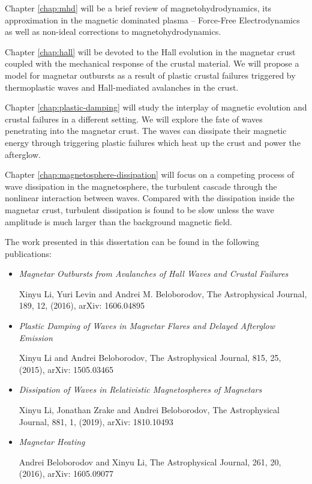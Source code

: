 Chapter \ref{chap:mhd} will be a brief review of magnetohydrodynamics, its approximation in the magnetic dominated plasma -- Force-Free Electrodynamics as well as non-ideal corrections to magnetohydrodynamics.

Chapter \ref{chap:hall} will be devoted to the Hall evolution in the magnetar crust coupled with the mechanical response of the crustal material. We will propose a model for magnetar outbursts as a result of plastic crustal failures triggered by thermoplastic waves and Hall-mediated avalanches in the crust.

Chapter \ref{chap:plastic-damping} will study the interplay of magnetic evolution and crustal failures in a different setting. We will explore the fate of \alfven waves penetrating into the magnetar crust. The \alfven waves can dissipate their magnetic energy through triggering plastic failures which heat up the crust and power the afterglow.

Chapter \ref{chap:magnetosphere-dissipation} will focus on a competing process of \alfven wave dissipation in the magnetosphere, the turbulent cascade through the nonlinear interaction between waves. Compared with the dissipation inside the magnetar crust, turbulent dissipation is found to be slow unless the wave amplitude is much larger than the background magnetic field.

The work presented in this dissertation can be found in the following publications:
\begin{itemize}
	
\item \textit{Magnetar Outbursts from Avalanches of Hall Waves and Crustal Failures} 

Xinyu Li,  Yuri Levin and Andrei M. Beloborodov, The Astrophysical Journal, 189, 12, (2016), arXiv: 1606.04895

\item \textit{Plastic Damping of \alfven Waves in Magnetar Flares and Delayed Afterglow Emission}
 
Xinyu Li and Andrei Beloborodov, The Astrophysical Journal, 815, 25, (2015), arXiv: 1505.03465

\item \textit{Dissipation of \alfven Waves in Relativistic Magnetospheres of Magnetars}
 
Xinyu Li, Jonathan Zrake and Andrei Beloborodov, The Astrophysical Journal, 881, 1, (2019), arXiv: 1810.10493

\item \textit{Magnetar Heating}

Andrei Beloborodov and Xinyu Li, The Astrophysical Journal, 261, 20, (2016), arXiv: 1605.09077

\end{itemize}





